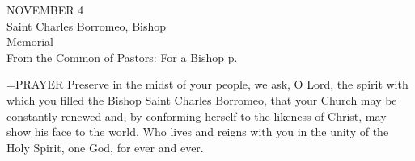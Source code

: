 \begin{center}\normalsize NOVEMBER 4\\
\footnotesize Saint Charles Borromeo, Bishop\\
\footnotesize Memorial\\
\footnotesize From the Common of Pastors: For a Bishop p.\\
\end{center}

\hangindent=\parindent \small{PRAYER 
Preserve in the midst of your people,
we ask, O Lord, the spirit with which you filled
the Bishop Saint Charles Borromeo,
that your Church may be constantly renewed
and, by conforming herself to the likeness of Christ,
may show his face to the world.
Who lives and reigns with you in the unity of the Holy Spirit,
one God, for ever and ever.\\}
 
